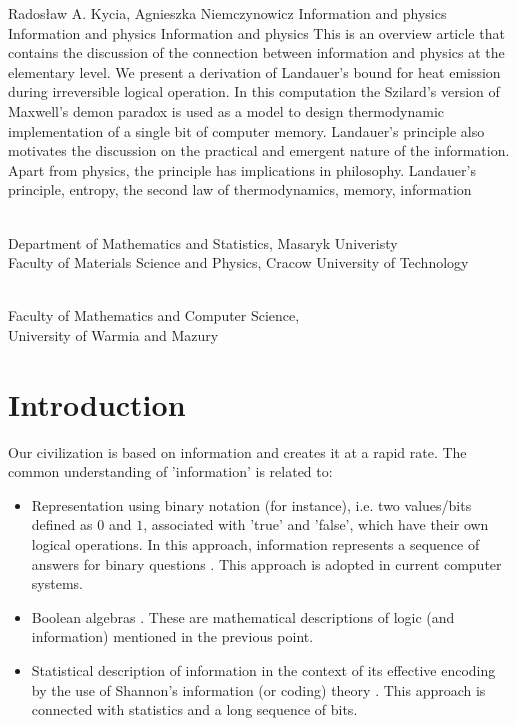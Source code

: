 \begin{artengenv2auth}{Rados\l aw A. Kycia, Agnieszka Niemczynowicz}
	{Information and physics}
	{Information and physics}
	{Information and physics}
	{}
	{This is an overview article that contains the discussion of the connection between information and physics at the elementary level. We present a derivation of Landauer's bound for heat emission during irreversible logical operation. In this computation the Szilard's version of Maxwell's demon paradox is used as a model to design thermodynamic implementation of a single bit of computer memory. Landauer's principle also motivates the discussion on the practical and emergent nature of the information. Apart from physics, the principle has implications in philosophy. }
	{Landauer's principle, entropy, the second law of thermodynamics, memory, information}
	{%
		{\flushright{}\\\subsubsectit\small{Department of Mathematics and Statistics, Masaryk Univeristy\\
		Faculty of Materials Science and Physics, Cracow University of Technology}\par}%
		{\flushright{}\\\subsubsectit\small{Faculty of Mathematics and Computer Science,\\
		University of Warmia and Mazury}\par}%
	}




\section{Introduction}
\lettrine[loversize=0.13,lines=2,lraise=-0.03,nindent=0em,findent=0.2pt]%
{O}{}ur civilization is based on information and creates it at a rapid rate. The common understanding of 'information' is related to:
\begin{itemize}
 \item {Representation using binary notation (for instance), i.e. two values/bits defined as $0$ and $1$, associated with 'true' and 'false', which have their own logical operations. In this approach, information represents a sequence of answers for binary questions \parencite{InformationEntropy}. This approach is adopted in current computer systems.}
 \item {Boolean algebras \parencite{InformationEntropy}. These are mathematical descriptions of logic (and information) mentioned in the previous point.}
 \item {Statistical description of information in the context of its effective encoding by the use of Shannon's information (or coding) theory \parencite{InformationEntropy}. This approach is connected with statistics and a long sequence of bits.}
\end{itemize}


\end{artengenv2auth}
